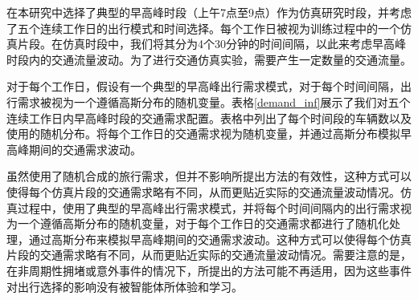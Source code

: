 在本研究中选择了典型的早高峰时段（上午7点至9点）作为仿真研究时段，并考虑了五个连续工作日的出行模式和时间选择。每个工作日被视为训练过程中的一个仿真片段。在仿真时段中，我们将其分为4个30分钟的时间间隔，以此来考虑早高峰时段内的交通流量波动。为了进行交通仿真实验，需要产生一定数量的交通流量。

对于每个工作日，假设有一个典型的早高峰出行需求模式，对于每个时间间隔，出行需求被视为一个遵循高斯分布的随机变量。表格\ref{demand_inf}展示了我们对五个连续工作日内早高峰时段的交通需求配置。表格中列出了每个时间段的车辆数以及使用的随机分布。将每个工作日的交通需求视为随机变量，并通过高斯分布模拟早高峰期间的交通需求波动。
\renewcommand{\arraystretch}{1.2} %
\begin{table}[htbp]
\centering
\caption{连续五个工作日早高峰期的出行需求配置}
\label{demand_inf}
\begin{adjustbox}{center}
\end{adjustbox}
\end{table}


虽然使用了随机合成的旅行需求，但并不影响所提出方法的有效性，这种方式可以使得每个仿真片段的交通需求略有不同，从而更贴近实际的交通流量波动情况。仿真过程中，使用了典型的早高峰出行需求模式，并将每个时间间隔内的出行需求视为一个遵循高斯分布的随机变量，对于每个工作日的交通需求都进行了随机化处理，通过高斯分布来模拟早高峰期间的交通需求波动。这种方式可以使得每个仿真片段的交通需求略有不同，从而更贴近实际的交通流量波动情况。需要注意的是，在非周期性拥堵或意外事件的情况下，所提出的方法可能不再适用，因为这些事件对出行选择的影响没有被智能体所体验和学习。



